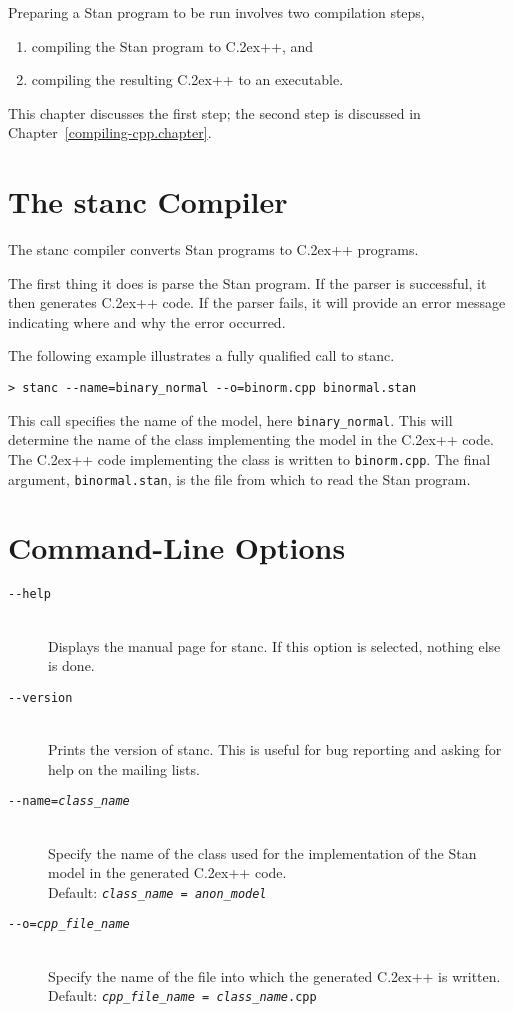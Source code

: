 \documentclass[10pt]{report}
\newcommand{\Stan}{Stan\xspace}
\newcommand{\stanc}{{\ttfamily stanc}\xspace}
\newcommand*{\Cpp}{C\raise.2ex\hbox{\footnotesize ++}\xspace} %
\newcommand{\code}[1]{{\tt #1}}
\newcommand{\refchapter}[1]{Chapter~\ref{#1.chapter}}
\begin{document}
Preparing a \Stan program to be run involves two compilation steps,
%
\begin{enumerate}
\item compiling the \Stan program to \Cpp, and
\item compiling the resulting \Cpp to an executable.
\end{enumerate}
%
This chapter discusses the first step; the second step is discussed in
\refchapter{compiling-cpp}.

\section{The \stanc Compiler}

The \stanc compiler converts \Stan programs to \Cpp programs.  

The first thing it does is parse the \Stan program.  If the parser is
successful, it then generates \Cpp code.  If the parser fails, it will
provide an error message indicating where and why the error occurred.

The following example illustrates a fully qualified call to \stanc.
%
\begin{verbatim}
> stanc --name=binary_normal --o=binorm.cpp binormal.stan 
\end{verbatim}
%
This call specifies the name of the model, here {\tt binary\_normal}.
This will determine the name of the class implementing the model in
the \Cpp code.  The \Cpp code implementing the class is written to
\code{binorm.cpp}.  The final argument, \code{binormal.stan}, is
the file from which to read the \Stan program.


\section{Command-Line Options}

\begin{description}
%
\item[\tt {-}-help] 
\mbox{ } \\ 
Displays the manual page for \stanc.  If this option is selected,
nothing else is done.
%
\item[\tt {-}-version]
\mbox{ } \\ 
Prints the version of \stanc.  This is useful for bug reporting
and asking for help on the mailing lists.
%
\item[\tt {-}-name={\slshape class\_name}]
\mbox{ } \\ 
Specify the name of the class used for the implementation of the
\Stan model in the generated \Cpp code.  
\\[6pt]
Default: {\tt {\slshape class\_name = anon\_model}}
%
\item[\tt {-}-o={\slshape cpp\_file\_name}]
\mbox{ } \\ 
Specify the name of the file into which the generated \Cpp is written.
\\[6pt]
Default: {\tt {\slshape cpp\_file\_name} = {\slshape class\_name}.cpp}
%
\end{description}
\end{document}
